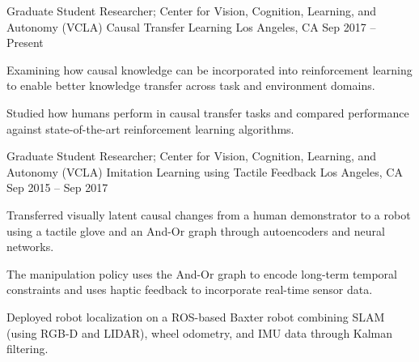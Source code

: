 


\begin{cventries}


\cventry
{Graduate Student Researcher; Center for Vision, Cognition, Learning, and Autonomy (VCLA)}
{Causal Transfer Learning}
{Los Angeles, CA}
{Sep 2017 – Present}
{
\begin{cvitems}
\item Examining how causal knowledge can be incorporated into reinforcement learning to enable better knowledge transfer across task and environment domains.
\item Studied how humans perform in causal transfer tasks and compared performance against state-of-the-art reinforcement learning algorithms.
\end{cvitems}
}


\cventry
{Graduate Student Researcher; Center for Vision, Cognition, Learning, and Autonomy (VCLA)}
{Imitation Learning using Tactile Feedback}
{Los Angeles, CA}
{Sep 2015 – Sep 2017}
{
\begin{cvitems}
\item Transferred visually latent causal changes from a human demonstrator to a robot using a tactile glove and an And-Or graph through autoencoders and neural networks.
\item The manipulation policy uses the And-Or graph to encode long-term temporal constraints and uses haptic feedback to incorporate real-time sensor data.
\item Deployed robot localization on a ROS-based Baxter robot combining SLAM (using RGB-D and LIDAR), wheel odometry, and IMU data through Kalman filtering.
\end{cvitems}
}


\end{cventries}
